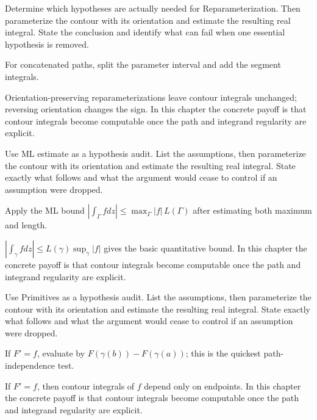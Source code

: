 \begin{exercise}\label{exr:iv04-03}
Determine which hypotheses are actually needed for Reparameterization. Then parameterize the contour with its orientation and estimate the resulting real integral. State the conclusion and identify what can fail when one essential hypothesis is removed.
\end{exercise}
\begin{hint}
For concatenated paths, split the parameter interval and add the segment integrals.
\end{hint}
\begin{solution}
Orientation-preserving reparameterizations leave contour integrals unchanged; reversing orientation changes the sign. In this chapter the concrete payoff is that contour integrals become computable once the path and integrand regularity are explicit.
\end{solution}

\begin{exercise}\label{exr:iv04-04}
Use ML estimate as a hypothesis audit. List the assumptions, then parameterize the contour with its orientation and estimate the resulting real integral. State exactly what follows and what the argument would cease to control if an assumption were dropped.
\end{exercise}
\begin{hint}
Apply the ML bound \(|\int_\Gamma fdz|\le \max_\Gamma|f|\,L(\Gamma)\) after estimating both maximum and length.
\end{hint}
\begin{solution}
$|\int_\gamma fdz|\le L(\gamma)\sup_\gamma|f|$ gives the basic quantitative bound. In this chapter the concrete payoff is that contour integrals become computable once the path and integrand regularity are explicit.
\end{solution}

\begin{exercise}\label{exr:iv04-05}
Use Primitives as a hypothesis audit. List the assumptions, then parameterize the contour with its orientation and estimate the resulting real integral. State exactly what follows and what the argument would cease to control if an assumption were dropped.
\end{exercise}
\begin{hint}
If \(F'=f\), evaluate by \(F(\gamma(b))-F(\gamma(a))\); this is the quickest path-independence test.
\end{hint}
\begin{solution}
If $F'=f$, then contour integrals of $f$ depend only on endpoints. In this chapter the concrete payoff is that contour integrals become computable once the path and integrand regularity are explicit.
\end{solution}

